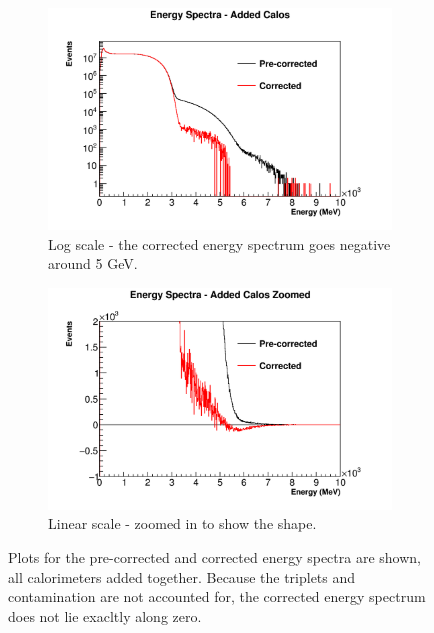 	\begin{figure}[]
	\centering
	    \begin{subfigure}[]{0.8\textwidth}
		    \centering
			\includegraphics[width=\textwidth]{AddedEnergies}
		    \caption{Log scale - the corrected energy spectrum goes negative around 5 GeV.}
	    \end{subfigure}%
	    \vspace{1cm}
	    \begin{subfigure}[]{0.8\textwidth}
		    \centering
			\includegraphics[width=\textwidth]{AddedEnergiesZoomed}
		    \caption{Linear scale - zoomed in to show the shape.}
	    \end{subfigure}
	\caption[AddedEnergies]{Plots for the pre-corrected and corrected energy spectra are shown, all calorimeters added together. Because the triplets and contamination are not accounted for, the corrected energy spectrum does not lie exacltly along zero.}
	\label{fig:AddedEnergies}
	\end{figure}

